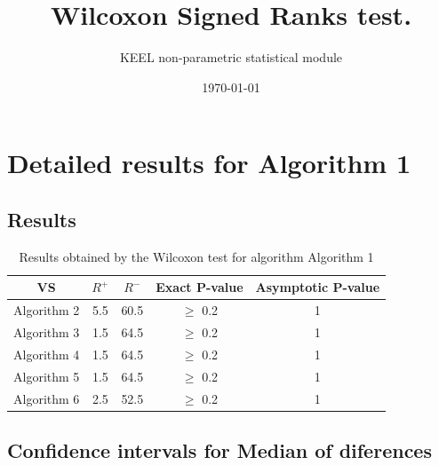 \documentclass[a4paper,10pt]{article}
\title{Wilcoxon Signed Ranks test.}
\date{\today}
\author{KEEL non-parametric statistical module}
\begin{document}
\pagestyle{empty}
\maketitle
\thispagestyle{empty}



\section{Detailed results for Algorithm 1}


\subsection{Results}

\begin{table}[!htp]
\centering\small
\begin{tabular}{
|c|c|c|c|c|}
\hline
 VS & $R^{+}$ & $R^{-}$ & Exact P-value & Asymptotic P-value \\ \hline 
Algorithm 2 & 5.5 & 60.5 & $\geq$ 0.2 & 1\\ \hline 
Algorithm 3 & 1.5 & 64.5 & $\geq$ 0.2 & 1\\ \hline 
Algorithm 4 & 1.5 & 64.5 & $\geq$ 0.2 & 1\\ \hline 
Algorithm 5 & 1.5 & 64.5 & $\geq$ 0.2 & 1\\ \hline 
Algorithm 6 & 2.5 & 52.5 & $\geq$ 0.2 & 1\\ \hline 

\end{tabular}
\caption{Results obtained by the Wilcoxon test for algorithm Algorithm 1}
\end{table}

\subsection{Confidence intervals for Median of diferences}
\end{document}
